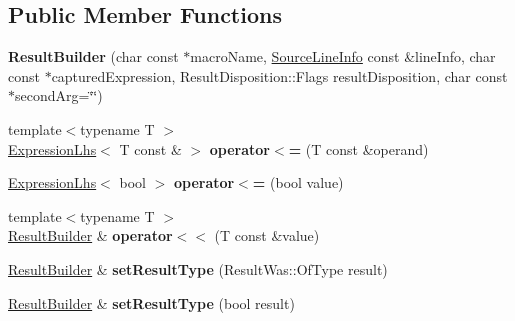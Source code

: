 \subsection*{Public Member Functions}
\begin{DoxyCompactItemize}
\item 
\mbox{\label{classCatch_1_1ResultBuilder_a8579c3056f64f9324cf1181532828376}} 
{\bfseries Result\+Builder} (char const $\ast$macro\+Name, \hyperlink{structCatch_1_1SourceLineInfo}{Source\+Line\+Info} const \&line\+Info, char const $\ast$captured\+Expression, Result\+Disposition\+::\+Flags result\+Disposition, char const $\ast$second\+Arg=\char`\"{}\char`\"{})
\item 
\mbox{\label{classCatch_1_1ResultBuilder_ad76939f5a52fcb534f97b49a0b7bc560}} 
{\footnotesize template$<$typename T $>$ }\\\hyperlink{classCatch_1_1ExpressionLhs}{Expression\+Lhs}$<$ T const  \& $>$ {\bfseries operator$<$=} (T const \&operand)
\item 
\mbox{\label{classCatch_1_1ResultBuilder_a3b87b20bcd1ef9e630880e59eeefba2a}} 
\hyperlink{classCatch_1_1ExpressionLhs}{Expression\+Lhs}$<$ bool $>$ {\bfseries operator$<$=} (bool value)
\item 
\mbox{\label{classCatch_1_1ResultBuilder_a5aa79ce6160ab8cd800eb65bbd7a28a4}} 
{\footnotesize template$<$typename T $>$ }\\\hyperlink{classCatch_1_1ResultBuilder}{Result\+Builder} \& {\bfseries operator$<$$<$} (T const \&value)
\item 
\mbox{\label{classCatch_1_1ResultBuilder_af896e372db9d7fc90ddeceff3ad110d0}} 
\hyperlink{classCatch_1_1ResultBuilder}{Result\+Builder} \& {\bfseries set\+Result\+Type} (Result\+Was\+::\+Of\+Type result)
\item 
\mbox{\label{classCatch_1_1ResultBuilder_ae504348b073d0360bfd5fc33347ec689}} 
\hyperlink{classCatch_1_1ResultBuilder}{Result\+Builder} \& {\bfseries set\+Result\+Type} (bool result)
\item 
\mbox{\label{classCatch_1_1ResultBuilder_a864e03b7300271de7cc44b9864463c5a}} 

\end{DoxyCompactItemize}
